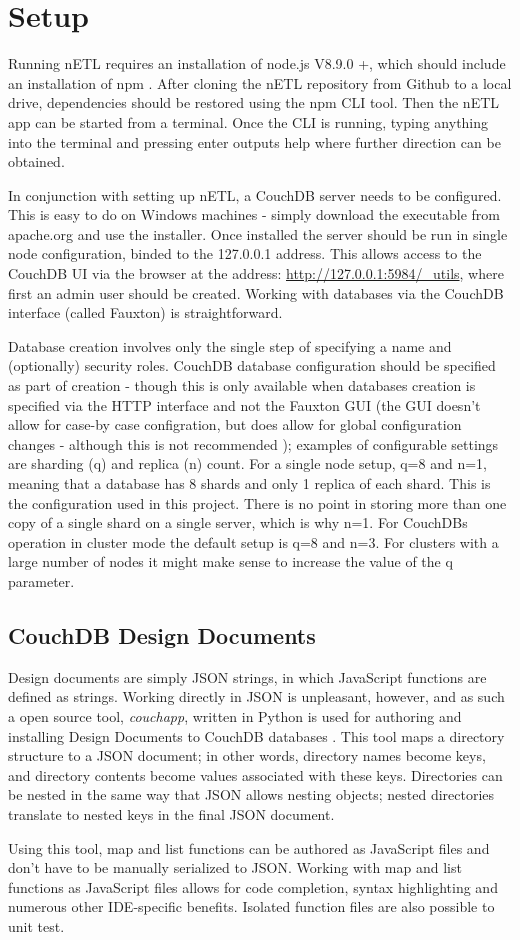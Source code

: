\section{Setup}
Running nETL requires an installation of node.js V8.9.0 +, which should include an installation of npm \cite{npm}. After cloning the nETL repository from Github to a local drive, dependencies should be restored using the npm CLI tool. Then the nETL app can be started from a terminal. Once the CLI is running, typing anything into the terminal and pressing enter outputs help where further direction can be obtained.

In conjunction with setting up nETL, a CouchDB server needs to be configured. This is easy to do on Windows machines - simply download the executable from apache.org and use the installer. Once installed the server should be run in single node configuration, binded to the 127.0.0.1 address. This allows access to the CouchDB UI via the browser at the address: \url{http://127.0.0.1:5984/\_utils}, where first an admin user should be created. Working with databases via the CouchDB interface (called Fauxton) is straightforward.

Database creation involves only the single step of specifying a name and (optionally) security roles. CouchDB database configuration should be specified as part of creation - though this is only available when databases creation is specified via the HTTP interface and not the Fauxton GUI (the GUI doesn't allow for case-by case configration, but does allow for global configuration changes - although this is not recommended \cite{fauxton}); examples of configurable settings are sharding (q) and replica (n) count. For a single node setup, q=8 and n=1, meaning that a database has 8 shards and only 1 replica of each shard. This is the configuration used in this project. There is no point in storing more than one copy of a single shard on a single server, which is why n=1. For CouchDBs operation in cluster mode the default setup is q=8 and n=3. For clusters with a large number of nodes it might make sense to increase the value of the q parameter.

\subsection{CouchDB Design Documents}
Design documents are simply JSON strings, in which JavaScript functions are defined as strings. Working directly in JSON is unpleasant, however, and as such a open source tool, \textit{couchapp}, written in Python is used for authoring and installing Design Documents to CouchDB databases \cite{pythonCouchapp}. This tool maps a directory structure to a JSON document; in other words, directory names become keys, and directory contents become values associated with these keys. Directories can be nested in the same way that JSON allows nesting objects; nested directories translate to nested keys in the final JSON document.

Using this tool, map and list functions can be authored as JavaScript files and don't have to be manually serialized to JSON. Working with map and list functions as JavaScript files allows for code completion, syntax highlighting and numerous other IDE-specific benefits. Isolated function files are also possible to unit test.